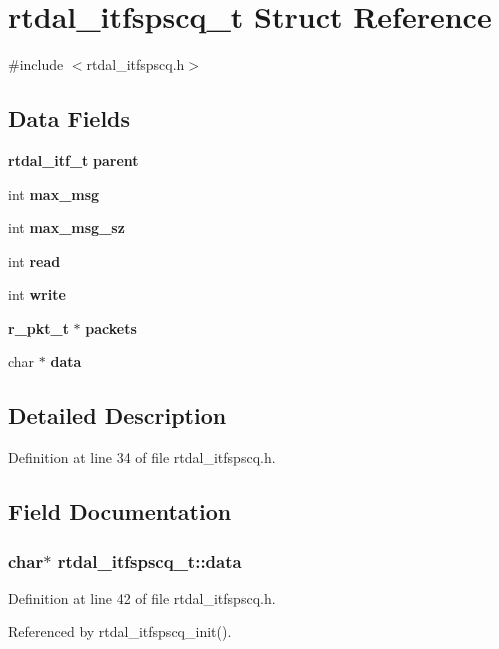 \section{rtdal\-\_\-itfspscq\-\_\-t Struct Reference}
\label{structrtdal__itfspscq__t}


{\ttfamily \#include $<$rtdal\-\_\-itfspscq.\-h$>$}

\subsection*{Data Fields}
\begin{DoxyCompactItemize}
\item 
{\bf rtdal\-\_\-itf\-\_\-t} {\bf parent}
\item 
int {\bf max\-\_\-msg}
\item 
int {\bf max\-\_\-msg\-\_\-sz}
\item 
int {\bf read}
\item 
int {\bf write}
\item 
{\bf r\-\_\-pkt\-\_\-t} $\ast$ {\bf packets}
\item 
char $\ast$ {\bf data}
\end{DoxyCompactItemize}


\subsection{Detailed Description}


Definition at line 34 of file rtdal\-\_\-itfspscq.\-h.



\subsection{Field Documentation}
\subsubsection[{data}]{\setlength{\rightskip}{0pt plus 5cm}char$\ast$ rtdal\-\_\-itfspscq\-\_\-t\-::data}\label{structrtdal__itfspscq__t_adc75f06ba07f4848a744a2ffb10ddb0e}


Definition at line 42 of file rtdal\-\_\-itfspscq.\-h.



Referenced by rtdal\-\_\-itfspscq\-\_\-init().

